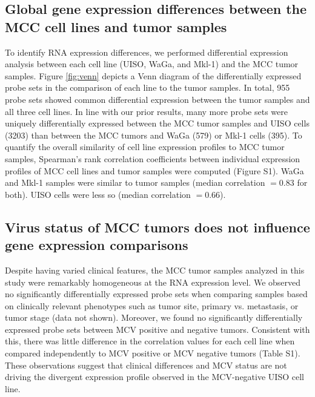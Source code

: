 \documentclass[10pt]{article}
\begin{document}
\subsection*{Global gene expression differences between the MCC cell lines and tumor samples}
To identify RNA expression differences, we performed differential expression analysis between each cell line (UISO, WaGa, and Mkl-1) and the MCC tumor samples.
Figure \ref{fig:venn} depicts a Venn diagram of the differentially expressed probe sets in the comparison of each line to the tumor samples.
In total, 955 probe sets showed common differential expression between the tumor samples and all three cell lines.
In line with our prior results, many more probe sets were uniquely differentially expressed between the MCC tumor samples and UISO cells (3203) than between the MCC tumors and WaGa (579) or Mkl-1 cells (395).
To quantify the overall similarity of cell line expression profiles to MCC tumor samples, Spearman's rank correlation coefficients between individual expression profiles of MCC cell lines and tumor samples were computed (Figure S1).
WaGa and Mkl-1 samples were similar to tumor samples (median correlation $=0.83$ for both).
UISO cells were less so (median correlation $=0.66$).

\subsection*{Virus status of MCC tumors does not influence gene expression comparisons}
Despite having varied clinical features, the MCC tumor samples analyzed in this study were remarkably homogeneous at the RNA expression level.
We observed no significantly differentially expressed probe sets when comparing samples based on clinically relevant phenotypes such as tumor site, primary vs. metastasis, or tumor stage (data not shown).
Moreover, we found no significantly differentially expressed probe sets between MCV positive and negative tumors.
Consistent with this, there was little difference in the correlation values for each cell line when compared independently to MCV positive or MCV negative tumors (Table S1).
These observations suggest that clinical differences and MCV status are not driving the divergent expression profile observed in the MCV-negative \citep{Houben2010Merkel} UISO cell line.
\end{document}
